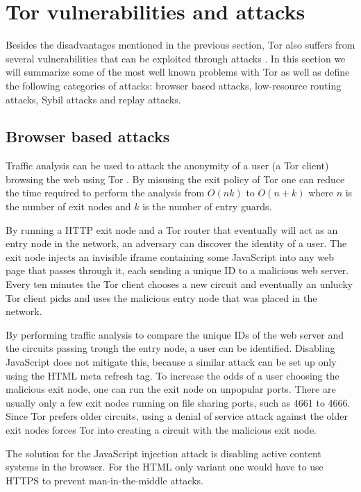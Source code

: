 \documentclass{article}
\begin{document}
\section{Tor vulnerabilities and attacks}
	\label{sec:attacks}
	
	Besides the disadvantages mentioned in the previous section, Tor also suffers from several vulnerabilities that can be exploited through attacks \cite{abbott2007browser, douceur2002sybil, bauer2007low}. In this section we will summarize some of the most well known problems with Tor as well as define the following categories of attacks: browser based attacks, low-resource routing attacks, Sybil attacks and replay attacks.

	\subsection{Browser based attacks}
		Traffic analysis can be used to attack the anonymity of a user (a Tor client) browsing the web using Tor \cite{abbott2007browser}. By misusing the exit policy of Tor one can reduce the time required to perform the analysis from $O(nk)$ to $O(n+k)$ where $n$ is the number of exit nodes and $k$ is the number of entry guards.

		By running a HTTP exit node and a Tor router that eventually will act as an entry node in the network, an adversary can discover the identity of a user. The exit node injects an invisible iframe containing some JavaScript into any web page that passes through it, each sending a unique ID to a malicious web server. Every ten minutes the Tor client chooses a new circuit and eventually an unlucky Tor client picks and uses the malicious entry node that was placed in the network.

		By performing traffic analysis to compare the unique IDs of the web server and the circuits passing trough the entry node, a user can be identified. Disabling JavaScript does not mitigate this, because a similar attack can be set up only using the HTML meta refresh tag. To increase the odds of a user choosing the malicious exit node, one can run the exit node on unpopular ports. There are usually only a few exit nodes running on file sharing ports, such as 4661 to 4666. Since Tor prefers older circuits, using a denial of service attack against the older exit nodes forces Tor into creating a circuit with the malicious exit node.

		The solution for the JavaScript injection attack is disabling active content systems in the browser. For the HTML only variant one would have to use HTTPS to prevent man-in-the-middle attacks.
		
\end{document}
